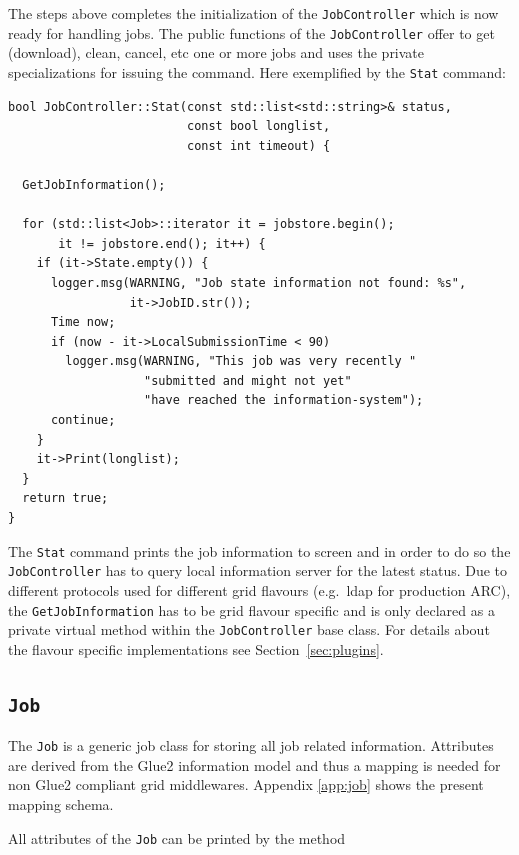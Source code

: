 \documentclass{book}
\newcommand{\Job}{\texttt{Job}}
\newcommand{\JobController}{\texttt{JobController}}
\begin{document}
The steps above completes the initialization of the {\JobController}
which is now ready for handling jobs. The public functions of the
{\JobController} offer to get (download), clean, cancel, etc one or
more jobs and uses the private specializations for issuing the
command. Here exemplified by the \texttt{Stat} command:

\begin{shaded}
\begin{small}
\begin{verbatim}
bool JobController::Stat(const std::list<std::string>& status,
                         const bool longlist,
                         const int timeout) {

  GetJobInformation();

  for (std::list<Job>::iterator it = jobstore.begin();
       it != jobstore.end(); it++) {
    if (it->State.empty()) {
      logger.msg(WARNING, "Job state information not found: %s",
                 it->JobID.str());
      Time now;
      if (now - it->LocalSubmissionTime < 90)
        logger.msg(WARNING, "This job was very recently "
                   "submitted and might not yet"
                   "have reached the information-system");
      continue;
    }
    it->Print(longlist);
  }
  return true;
}
\end{verbatim}
\end{small}
\end{shaded}

The \texttt{Stat} command prints the job information to screen and in
order to do so the {\JobController} has to query local information
server for the latest status. Due to different protocols used for
different grid flavours (e.g.\ ldap for production ARC), the
\texttt{GetJobInformation} has to be grid flavour specific and is only
declared as a private virtual method within the {\JobController} base
class. For details about the flavour specific implementations see
Section~\ref{sec:plugins}.

\subsection{{\Job}}

The {\Job} is a generic job class for storing all job related
information. Attributes are derived from the Glue2 information model
and thus a mapping is needed for non Glue2 compliant grid middlewares.
Appendix \ref{app:job} shows the present mapping schema.

All attributes of the {\Job} can be printed by the method
\end{document}
